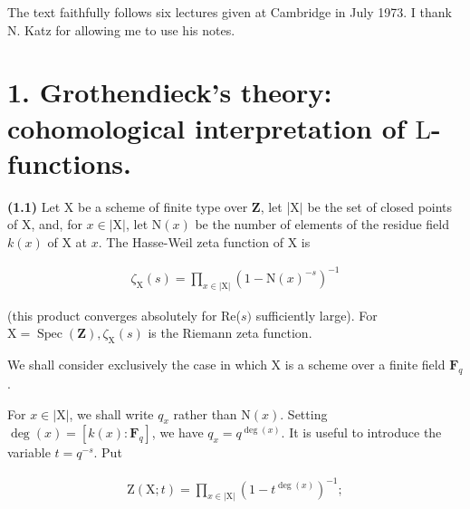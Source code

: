 \documentclass[10pt,leqno]{article}
\begin{document}
\noindent The text faithfully follows six lectures given at Cambridge in July 1973. I thank \(\mathrm{N}\). Katz for allowing me to use his notes.\par

\section*{1. Grothendieck’s theory: cohomological interpretation of \(\mathrm{L}\)-functions.}

\noindent \textbf{(1.1)} Let \(\mathrm{X}\) be a scheme of finite type over \(\mathbf{Z}\), let |\(\mathrm{X}|\) be the set of closed points of \(\mathrm{X}\), and, for \(x\in |\mathrm{X}|\), let \(\mathrm{N}(x)\) be the number of elements of the residue field \(k(x)\) of \(\mathrm{X}\) at \(x\). The Hasse-Weil zeta function of \(\mathrm{X}\) is\par

\begin{equation*}\begin{gathered}\zeta _{\mathrm{X}}(s) = \prod _{x\in |\mathrm{X}|} (1 -  \mathrm{N}(x)^{- s})^{- 1}\end{gathered}\tag{1.1.1}\end{equation*}

\noindent (this product converges absolutely for Re(\(s)\) sufficiently large). For \(\mathrm{X} = \operatorname{Spec}(\mathbf{Z}), \zeta _{\mathrm{X}}(s)\) is the Riemann zeta function.\par

\noindent We shall consider exclusively the case in which \(\mathrm{X}\) is a scheme over a finite field \(\mathbf{F}_{q}\).\par

\clearpage

\label{physical-3}\par\smallskip

\noindent For \(x\in |\mathrm{X}|\), we shall write \(q_{x}\) rather than \(\mathrm{N}(x)\). Setting \(\operatorname{deg}(x)=[k(x):\mathbf{F}_{q}]\), we have \(q_{x}=q^{\operatorname{deg}(x)}\). It is useful to introduce the variable \(t=q^{- s}\). Put\par

\begin{equation*}\begin{gathered}\mathrm{Z}(\mathrm{X}; t) = \prod _{x\in |\mathrm{X}|} (1 -  t^{\operatorname{deg}(x)})^{- 1} ;\end{gathered}\tag{1.1.2}\end{equation*}
\end{document}
